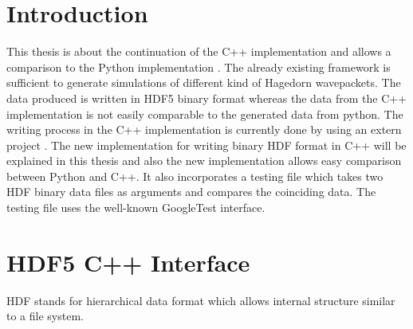 \documentclass{article}
\begin{document}



\tableofcontents
\clearpage

\section{Introduction}
This thesis is about the continuation of the C++ implementation \cite{libwaveblocks} and allows a comparison to the Python implementation \cite{waveblocksnd}. The already existing framework is sufficient to generate simulations of different kind of Hagedorn wavepackets. The data produced is written in HDF5 binary format whereas the data from the C++ implementation is not easily comparable to the generated data from python. The writing process in the C++ implementation is currently done by using an extern project \cite{eigen3-hdf5}. The new implementation for writing binary HDF format in C++ will be explained in this thesis and also the new implementation allows easy comparison between Python and C++. It also incorporates a testing file which takes two HDF binary data files as arguments and compares the coinciding data. The testing file uses the well-known GoogleTest interface\cite{googletest}.

\section{HDF5 C++ Interface}
HDF stands for hierarchical data format which allows internal structure similar to a file system.
\end{document}
